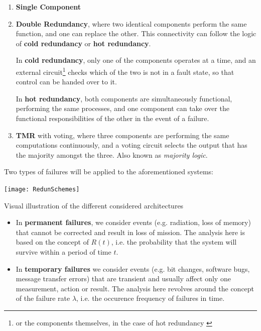 \documentclass[a4paper,nobib]{tufte-book}
\def\e{\ignorespaces}
\def\acusepage#1{}
\begin{document}
\begin{enumerate}
	\item \textbf{Single Component}
	\item \textbf{Double Redundancy}, where two identical components perform the same function, and one can replace the other. This connectivity can follow the logic of \textbf{cold redundancy} or \textbf{hot redundancy}.
	
	In \textbf{cold redundancy}, only one of the components operates at a time, and an external circuit\footnote{or the components themselves, in the case of hot redundancy \autocite[20]{SAVOIR-HB-003}} checks which of the two is not in a fault state, so that control can be handed over to it.

	In \textbf{hot redundancy}, both components are simultaneously functional, performing the same processes, and one component can take over the functional responsibilities of the other in the event of a failure.

	\item \textbf{\acf{TMR}} with voting, where three components are performing the same computations continuously, and a voting circuit selects the output that has the majority amongst the three. Also known as \emph{majority logic}.
\end{enumerate}

Two types of failures will be applied to the aforementioned systems:

\begin{marginfigure}
\centering
\texttt{[image: RedunSchemes]}
\caption{Visual illustration of the different considered architectures}
\acusepage{voter}
\end{marginfigure}
\begin{itemize}
\item In \textbf{permanent failures}, we consider events (e.g. radiation, loss of memory) that cannot be corrected and result in loss of mission. The analysis here is based on the concept of \e{reliability} \( R(t) \), i.e. the probability that the system will survive within a period of time \( t \).
\item In \textbf{temporary failures} we consider events (e.g. bit changes, software bugs, message transfer errors) that are transient and usually affect only one measurement, action or result. The analysis here revolves around the concept of the failure rate \( \lambda \), i.e. the occurence frequency of failures in time.
\end{itemize}
\end{document}
